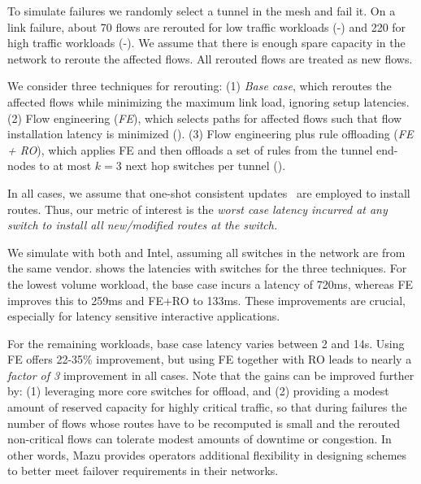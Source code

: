 To simulate failures we randomly select a tunnel in the mesh and fail it.  On
a link failure, about 70 flows are rerouted for low traffic workloads
(\sA-\sC) and 220 for high traffic workloads (\sD-\sF).  We assume that there
is enough spare capacity in the network to reroute the affected flows. All
rerouted flows are treated as new flows.  

We consider three techniques for rerouting: (1) {\em Base case}, which
reroutes the affected flows while minimizing the maximum link load, ignoring
setup latencies.
(2) Flow engineering ({\em FE}), which selects paths for affected flows such
that flow installation latency is minimized (). (3) Flow
engineering plus rule offloading ({\em FE + RO}), which applies FE and
then offloads a set of rules from the tunnel end-nodes to at most $k=3$ next
hop switches per tunnel (). 

In all cases, we assume that one-shot consistent updates~\cite{one-shot} are employed to install routes. Thus, our metric of interest is the {\em worst case latency incurred at any switch to install all new/modified routes at the switch.}

We simulate with both \BroadcomOne and Intel, assuming all switches in the
network are from the same vendor.  shows the
latencies with \BroadcomOne switches for the three techniques. For the lowest
volume workload, the base case incurs a latency of 720ms, whereas FE improves
this to 259ms and FE+RO to 133ms. These improvements are crucial, especially
for latency sensitive interactive applications.

For the remaining workloads, base case latency varies between 2 and 14s.
Using FE offers 22-35\% improvement, but using FE together with RO leads to
nearly a {\em factor of 3} improvement in all cases. Note that the gains can
be improved further by: (1) leveraging more core switches for offload, and (2)
providing a modest amount of reserved capacity for highly critical traffic,
so that during failures the number of flows whose routes have to be
recomputed is small and the rerouted non-critical flows can tolerate modest
amounts of downtime or congestion. In other words, Mazu provides operators
additional flexibility in designing schemes to better meet failover
requirements in their networks.


